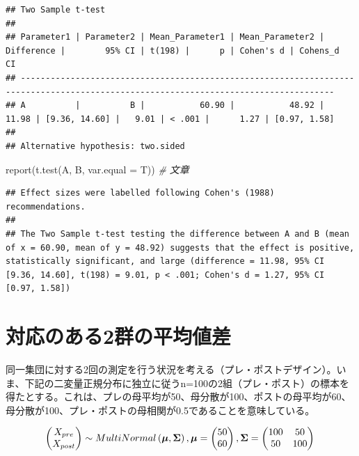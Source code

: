 \documentclass[
  ja=standard, xelatex, base=12pt]{bxjsreport}
\newenvironment{Shaded}{\begin{snugshade}}{\end{snugshade}}
\newcommand{\AttributeTok}[1]{\textcolor[rgb]{0.77,0.63,0.00}{#1}}
\newcommand{\CommentTok}[1]{\textcolor[rgb]{0.56,0.35,0.01}{\textit{#1}}}
\newcommand{\FunctionTok}[1]{\textcolor[rgb]{0.00,0.00,0.00}{#1}}
\newcommand{\NormalTok}[1]{#1}
\begin{document}
\begin{verbatim}
## Two Sample t-test
## 
## Parameter1 | Parameter2 | Mean_Parameter1 | Mean_Parameter2 | Difference |        95% CI | t(198) |      p | Cohen's d | Cohens_d  CI
## -------------------------------------------------------------------------------------------------------------------------------------
## A          |          B |           60.90 |           48.92 |      11.98 | [9.36, 14.60] |   9.01 | < .001 |      1.27 | [0.97, 1.58]
## 
## Alternative hypothesis: two.sided
\end{verbatim}

\begin{Shaded}
\begin{Highlighting}[]
\FunctionTok{report}\NormalTok{(}\FunctionTok{t.test}\NormalTok{(A, B, }\AttributeTok{var.equal =}\NormalTok{ T)) }\CommentTok{\# 文章}
\end{Highlighting}
\end{Shaded}

\begin{verbatim}
## Effect sizes were labelled following Cohen's (1988) recommendations.
## 
## The Two Sample t-test testing the difference between A and B (mean of x = 60.90, mean of y = 48.92) suggests that the effect is positive, statistically significant, and large (difference = 11.98, 95% CI [9.36, 14.60], t(198) = 9.01, p < .001; Cohen's d = 1.27, 95% CI [0.97, 1.58])
\end{verbatim}

\hypertarget{ux5bfeux5fdcux306eux3042ux308b2ux7fa4ux306eux5e73ux5747ux5024ux5dee}{%
\section{対応のある2群の平均値差}\label{ux5bfeux5fdcux306eux3042ux308b2ux7fa4ux306eux5e73ux5747ux5024ux5dee}}

同一集団に対する2回の測定を行う状況を考える（プレ・ポストデザイン）。いま、下記の二変量正規分布に独立に従うn=100の2組（プレ・ポスト）の標本を得たとする。これは、プレの母平均が50、母分散が100、ポストの母平均が60、母分散が100、プレ・ポストの母相関が0.5であることを意味している。

\[
\begin{pmatrix} X_{pre} \\ X_{post} \end{pmatrix} \sim MultiNormal \left( \boldsymbol{\mu}, \boldsymbol{\Sigma} \right),\\
\boldsymbol{\mu} = \begin{pmatrix} 50 \\ 60 \end{pmatrix}, 
\boldsymbol{\Sigma} = \begin{pmatrix} 100 & 50 \\ 
50 & 100 \end{pmatrix}\\
\]
\end{document}
